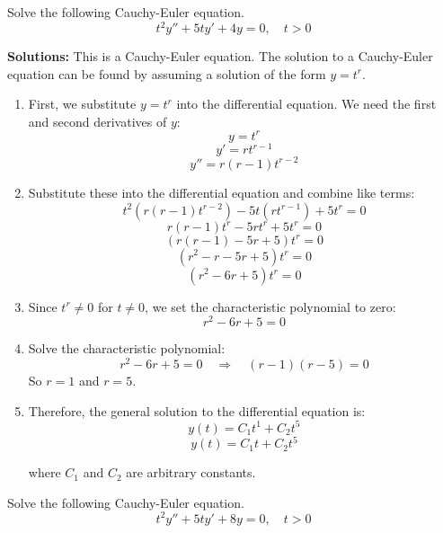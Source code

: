 \ifnum {}
\question[4] Solve the following Cauchy-Euler equation. 
$$t^2y'' +5ty' + 4y = 0, \quad t > 0$$

\ifnum {} {\color{DarkBlue} 
\textbf{Solutions:}
This is a Cauchy-Euler equation. The solution to a Cauchy-Euler equation can be found by assuming a solution of the form \( y = t^r \). 

\begin{enumerate}
    \item First, we substitute \( y = t^r \) into the differential equation. We need the first and second derivatives of \( y \):
   \[ y = t^r \]
   \[ y' = r t^{r-1} \]
   \[ y'' = r (r-1) t^{r-2} \]

    \item Substitute these into the differential equation and combine like terms:
   \[ t^2 (r (r-1) t^{r-2}) - 5t (r t^{r-1}) + 5 t^r = 0 \]
   \[ r (r-1) t^r - 5r t^r + 5 t^r = 0 \]
   \[ (r (r-1) - 5r + 5) t^r = 0 \]
   \[ (r^2 - r - 5r + 5) t^r = 0 \]
   \[ (r^2 - 6r + 5) t^r = 0 \]

    \item Since \( t^r \neq 0 \) for \( t \neq 0 \), we set the characteristic polynomial to zero:
   \[ r^2 - 6r + 5 = 0 \]

    \item Solve the characteristic polynomial:
   \[ r^2 - 6r + 5 = 0 \quad \Rightarrow \quad (r - 1)(r - 5) = 0 \]
   So \( r = 1 \) and \( r = 5 \).

    \item Therefore, the general solution to the differential equation is:
   \[ y(t) = C_1 t^1 + C_2 t^5 \]
   \[ y(t) = C_1 t + C_2 t^5 \]

where \( C_1 \) and \( C_2 \) are arbitrary constants.
\end{enumerate}


} 
\else 
\newpage
\fi
\fi 




\ifnum {}
\question[4] Solve the following Cauchy-Euler equation. 
$$t^2y'' +5ty' + 8y = 0, \quad t > 0$$

